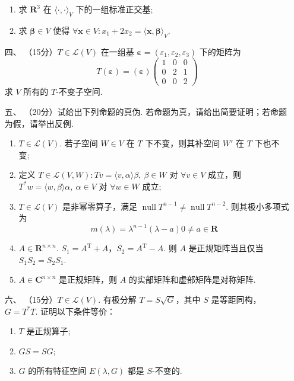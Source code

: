 \begin{enumerate}
\begin{enumerate}[label=(\arabic*)]
        \item 求 $ \mathbf{R}^3 $ 在 $ \langle \cdot, \cdot \rangle_V $ 下的一组标准正交基;

        \item 求 $ \boldsymbol{\beta} \in V $ 使得 $ \forall \boldsymbol{x} \in V: x_1 + 2x_2 = \langle \boldsymbol{x}, \boldsymbol{\beta} \rangle_V $.
    \end{enumerate}
	\item[四、]（15分）$ T \in \mathcal{L}(V) $ 在一组基 $ \boldsymbol{\varepsilon} = (\varepsilon_1, \varepsilon_2, \varepsilon_3) $ 下的矩阵为
    \[ T(\boldsymbol{\varepsilon}) = (\boldsymbol{\varepsilon}) \begin{pmatrix} 1 & 0 & 0 \\ 0 & 2 & 1 \\ 0 & 0 & 2 \end{pmatrix} \]
    求 $ V $ 所有的 $ T $-不变子空间.
	\item[五、]（20分）试给出下列命题的真伪. 若命题为真，请给出简要证明；若命题为假，请举出反例.
	\begin{enumerate}[label=(\arabic*)]
        \item $ T \in \mathcal{L}(V) $. 若子空间 $ W \in V $ 在 $ T $ 下不变，则其补空间 $ W' $ 在 $ T $ 下也不变;

        \item 定义 $ T \in \mathcal{L}(V, W) : Tv = \langle v, \alpha \rangle \beta,\ \beta \in W $ 对 $ \forall v \in V $ 成立，则 $ T^* w = \langle w, \beta \rangle \alpha,\ \alpha \in V $ 对 $ \forall w \in W $ 成立;

        \item $ T \in \mathcal{L}(V) $ 是非幂零算子，满足 $ \operatorname{null} T^{n - 1} \neq \operatorname{null} T^{n - 2} $. 则其极小多项式为
        \[ m(\lambda) = \lambda^{n-1}(\lambda - a) 0 \neq a \in \mathbf{R} \]

        \item $ A \in \mathbf{R}^{n \times n} $. $ S_1 = A^{\mathrm{T}} + A $，$ S_2 = A^{\mathrm{T}} - A $. 则 $ A $ 是正规矩阵当且仅当 $ S_1 S_2 = S_2 S_1 $.

        \item $ A \in \mathbf{C}^{n \times n} $ 是正规矩阵，则 $ A $ 的实部矩阵和虚部矩阵是对称矩阵.
    \end{enumerate}
	\item[六、]（15分）$ T \in \mathcal{L}(V) $. 有极分解 $ T = S \sqrt{G} $，其中 $ S $ 是等距同构，$ G = T^* T $. 证明以下条件等价：
    \begin{enumerate}[label=(\arabic*)]
        \item $ T $ 是正规算子;

        \item $ GS = SG $;

        \item $ G $ 的所有特征空间 $ E(\lambda, G) $ 都是 $ S $-不变的.
    \end{enumerate}
\end{enumerate}

\clearpage
